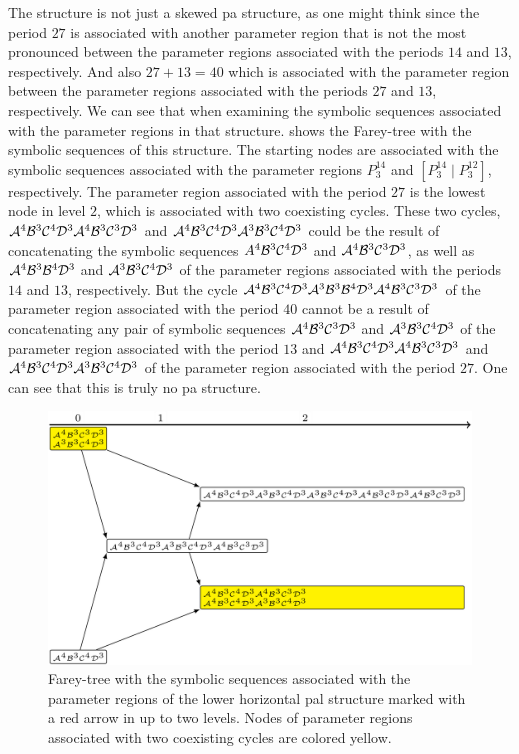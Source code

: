 The structure is not just a skewed \gls{pa} structure, as one might think since the period $27$ is associated with another parameter region that is not the most pronounced between the parameter regions associated with the periods $14$ and $13$, respectively.
And also $27 + 13 = 40$ which is associated with the parameter region between the parameter regions associated with the periods $27$ and $13$, respectively.
We can see that when examining the symbolic sequences associated with the parameter regions in that structure.
 shows the Farey-tree with the symbolic sequences of this structure.
The starting nodes are associated with the symbolic sequences associated with the parameter regions $P^{14}_3$ and $\left[P^{14}_3 \mid P^{12}_3\right]$, respectively.
The parameter region associated with the period $27$ is the lowest node in level $2$, which is associated with two coexisting cycles.
These two cycles, $\mathcal{A}^4\mathcal{B}^3\mathcal{C}^4\mathcal{D}^3\mathcal{A}^4\mathcal{B}^3\mathcal{C}^3\mathcal{D}^3$ and $\mathcal{A}^4\mathcal{B}^3\mathcal{C}^4\mathcal{D}^3\mathcal{A}^3\mathcal{B}^3\mathcal{C}^4\mathcal{D}^3$ could be the result of concatenating the symbolic sequences $A^4\mathcal{B}^3\mathcal{C}^4\mathcal{D}^3$ and $\mathcal{A}^4\mathcal{B}^3\mathcal{C}^3\mathcal{D}^3$, as well as $\mathcal{A}^4\mathcal{B}^3\mathcal{B}^4\mathcal{D}^3$ and $\mathcal{A}^3\mathcal{B}^3\mathcal{C}^4\mathcal{D}^3$ of the parameter regions associated with the periods $14$ and $13$, respectively.
But the cycle $\mathcal{A}^4\mathcal{B}^3\mathcal{C}^4\mathcal{D}^3\mathcal{A}^3\mathcal{B}^3\mathcal{B}^4\mathcal{D}^3\mathcal{A}^4\mathcal{B}^3\mathcal{C}^3\mathcal{D}^3$ of the parameter region associated with the period $40$ cannot be a result of concatenating any pair of symbolic sequences $\mathcal{A}^4\mathcal{B}^3\mathcal{C}^3\mathcal{D}^3$ and $\mathcal{A}^3\mathcal{B}^3\mathcal{C}^4\mathcal{D}^3$ of the parameter region associated with the period $13$ and $\mathcal{A}^4\mathcal{B}^3\mathcal{C}^4\mathcal{D}^3\mathcal{A}^4\mathcal{B}^3\mathcal{C}^3\mathcal{D}^3$ and $\mathcal{A}^4\mathcal{B}^3\mathcal{C}^4\mathcal{D}^3\mathcal{A}^3\mathcal{B}^3\mathcal{C}^4\mathcal{D}^3$ of the parameter region associated with the period $27$.
One can see that this is truly no \gls{pa} structure.

\begin{figure}
	\centering
	\includegraphics[width=.7 \textwidth]{../Figures/7/7.13/adding.png}
	\caption[Farey-tree with the symbolic sequences of a horizontal  structure]{
		Farey-tree with the symbolic sequences associated with the parameter regions of the lower horizontal \gls{pal} structure marked with a red arrow in  up to two levels.
		Nodes of parameter regions associated with two coexisting cycles are colored yellow.
	}
	\label{fig:add.add.like.hor.tree}
\end{figure}

